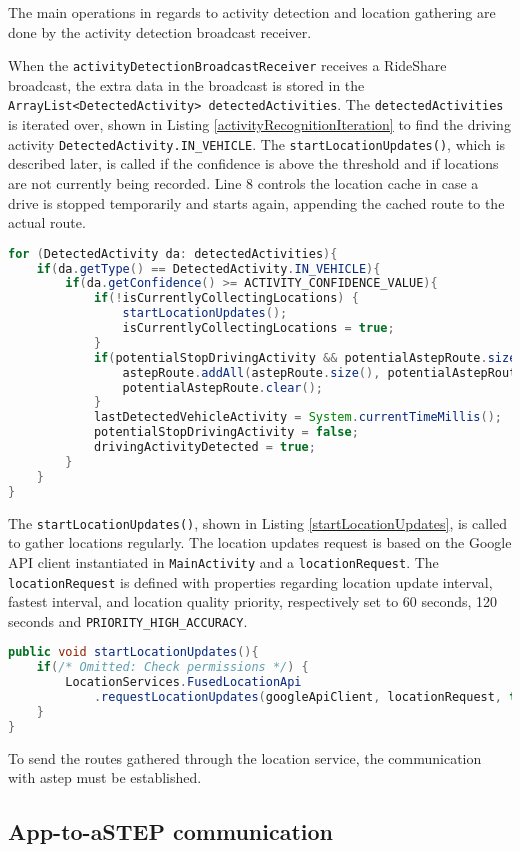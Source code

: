 


The main operations in regards to activity detection and location gathering are done by the activity detection broadcast receiver.

When the \texttt{activityDetectionBroadcastReceiver} receives a RideShare broadcast, the extra data in the broadcast is stored in the \texttt{ArrayList<DetectedActivity> detectedActivities}.
The \texttt{detectedActivities} is iterated over, shown in Listing \ref{activityRecognitionIteration} to find the driving activity \texttt{DetectedActivity.IN\_VEHICLE}.
The \texttt{startLocationUpdates()}, which is described later, is called if the confidence is above the threshold and if locations are not currently being recorded.
Line 8 controls the location cache in case a drive is stopped temporarily and starts again, appending the cached route to the actual route.

\begin{lstlisting}[language=Java, label=activityRecognitionIteration, caption=Iteration over received list of activity recognition.]
for (DetectedActivity da: detectedActivities){
	if(da.getType() == DetectedActivity.IN_VEHICLE){
		if(da.getConfidence() >= ACTIVITY_CONFIDENCE_VALUE){
			if(!isCurrentlyCollectingLocations) {
				startLocationUpdates();
				isCurrentlyCollectingLocations = true;
			}
			if(potentialStopDrivingActivity && potentialAstepRoute.size() > 0){
				astepRoute.addAll(astepRoute.size(), potentialAstepRoute);
				potentialAstepRoute.clear();
			}
			lastDetectedVehicleActivity = System.currentTimeMillis();
			potentialStopDrivingActivity = false;
			drivingActivityDetected = true;
		}
	}
}
\end{lstlisting}

The \texttt{startLocationUpdates()}, shown in Listing \ref{startLocationUpdates}, is called to gather locations regularly.
The location updates request is based on the Google API client instantiated in \texttt{MainActivity} and a \texttt{locationRequest}.
The \texttt{locationRequest} is defined with properties regarding location update interval, fastest interval, and location quality priority, respectively set to  60 seconds, 120 seconds and \texttt{PRIORITY\_HIGH\_ACCURACY}.

\begin{lstlisting}[language=Java, label=startLocationUpdates, caption=Start location updates functions.]
public void startLocationUpdates(){
	if(/* Omitted: Check permissions */) {
		LocationServices.FusedLocationApi
			.requestLocationUpdates(googleApiClient, locationRequest, this);
	}
}
\end{lstlisting}

To send the routes gathered through the location service, the communication with \gls{astep} must be established.

\subsection{App-to-aSTEP communication}


